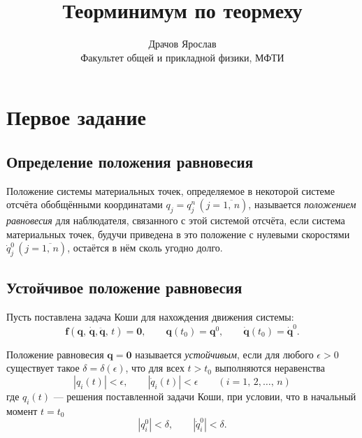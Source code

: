 \documentclass[a4paper]{article}
\title{Теорминимум
по теормеху}
\author{Драчов Ярослав\\ Факультет общей и прикладной физики, МФТИ}
\begin{document}
%
\maketitle
\listoftodos[Исправления]
\tableofcontents

\section{Первое задание}
\subsection{Определение положения равновесия}
\begin{dfn}
	Положение системы материальных точек,
	определяемое в некоторой системе
	отсчёта обобщёнными координатами $q_j=q_j^n\,\left( j=\overline{1,\,n} \right) $,
	называется \emph{положением равновесия} для наблюдателя, связанного
	с этой системой отсчёта, если система материальных точек, будучи
	приведена в это положение с нулевыми скоростями $\dot{q}_j^0\,
	\left( j= \overline{1,\,n} \right) $, остаётся в нём сколь угодно долго.
\end{dfn}
\subsection{Устойчивое положение равновесия}
Пусть 
	поставлена задача Коши для нахождения движения системы:
	\[
		\mathbf{f}\left( \mathbf{q},\,\dot{\mathbf{q}},
		\ddot{\mathbf{q}},\,t \right) =\mathbf{0}, \qquad
		\mathbf{q}(t_0)=\mathbf{q}^0,\qquad
		\dot{\mathbf{q}}(t_0)=\dot{\mathbf{q}}^0
	.\] 
\begin{dfn}
	Положение равновесия $\mathbf{q}=\mathbf{0}$ называется  \emph{устойчивым},
	если для любого $\epsilon >0$ существует такое $\delta=\delta(\epsilon)$,
	что для всех $t>t_0$ выполняются неравенства
	\[
		|q_i(t)|<\epsilon,\qquad \left|\dot{q}_i(t)\right|<\epsilon
		\qquad(i=1,\,2,\ldots
		,\,n)
	\] 
	где $q_i(t)$ --- решения поставленной задачи Коши,
	при условии, что в начальный момент $t=t_0$ 
	\[
	|q_i^0|<\delta,\qquad \left|\dot{q}_i^0\right|<\delta
	.\] 
\end{dfn}
\end{document}
